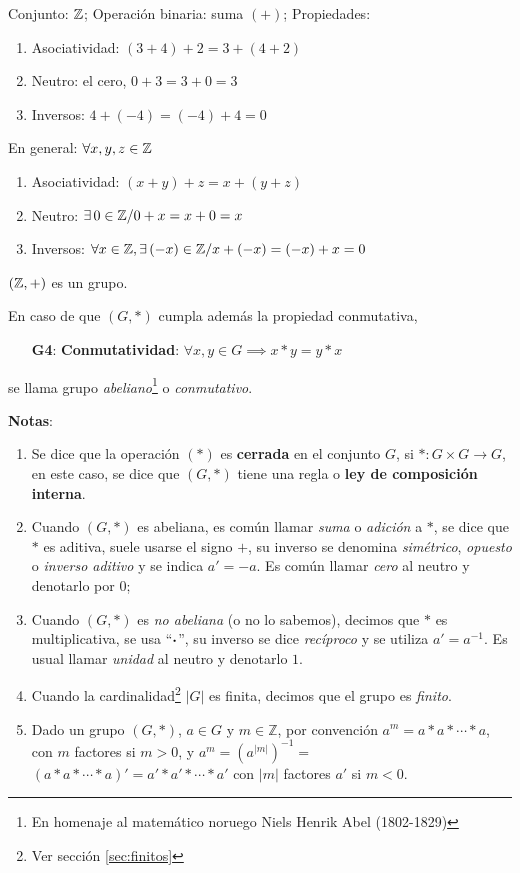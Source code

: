 \begin{fmd-example}
	Conjunto: $\mathbb{Z}$; Operación binaria: suma $(+)$; Propiedades:
	\begin{enumerate}
		\item Asociatividad: $(3 + 4) + 2 = 3 + (4 + 2)$
		\item Neutro: el cero, $0 + 3 = 3 + 0 = 3$
		\item Inversos: $4 + (-4) = (-4) + 4 = 0$
	\end{enumerate}
	En general: $\forall x, y, z \in \mathbb{Z}$
	\begin{enumerate}
		\item Asociatividad: $(x + y) + z = x + (y + z)$
		\item Neutro: $\exists \, 0 \in \mathbb{Z} / 0 + x = x + 0 = x$
		\item Inversos: $\forall x \in \mathbb{Z} , \exists \, (-x) \in \mathbb{Z} / x + (-x) = (-x) + x = 0$
	\end{enumerate}
	$(\mathbb{Z}, +)$ es un grupo.
\end{fmd-example}


\begin{fmd-definition}
	En caso de que $(G, *)$ cumpla además la propiedad conmutativa,
	
	\begin{enumerate}
		\item[\textbf{G4}:] \textbf{Conmutatividad}: $\forall x, y \in G \implies x*y = y*x$
	\end{enumerate}
	se llama grupo \textit{abeliano}\footnote{En homenaje al matemático noruego Niels Henrik Abel (1802-1829)} o \textit{conmutativo}.
\end{fmd-definition}


\textbf{Notas}:
\begin{enumerate}[label=\roman*)]
	\item Se dice que la operación $(*)$ es \textbf{cerrada} en el conjunto $G$, si $*: G \times G \rightarrow G$, en este caso, se dice que $(G, *)$ tiene una regla o \textbf{ley de composición interna}.
	
	\item Cuando $(G, *)$ es abeliana, es común llamar \textit{suma} o \textit{adición} a $*$, se dice que $*$ es aditiva, suele usarse el signo $+$, su inverso se denomina \textit{simétrico}, \textit{opuesto} o \textit{inverso aditivo} y se indica $a' = -a$. Es común llamar \textit{cero} al neutro y denotarlo por $0$;
	\item Cuando $(G, *)$ es \textit{no abeliana} (o no lo sabemos), decimos que $*$ es multiplicativa, se usa ``$\boldsymbol{\cdot}$'', su inverso se dice \textit{recíproco} y se utiliza $a' = a^{-1}$. Es usual llamar \textit{unidad} al neutro y denotarlo $1$.
	\item Cuando la cardinalidad\footnote{Ver sección \ref{sec:finitos}} $|G|$ es finita, decimos que el grupo es \textit{finito}.
	\item Dado un grupo $(G, *)$, $a\in G$ y $m \in \mathbb{Z}$, por convención $a^m = a*a* \cdots *a$, con $m$ factores si $m>0$, y $a^m = (a^{|m|})^{-1} =$ $\left(a*a* \cdots *a\right)' = a'*a'* \cdots *a'$ con $|m|$ factores $a'$ si $m<0$.
\end{enumerate}


